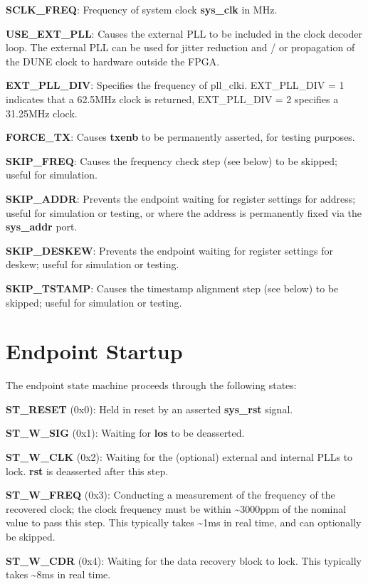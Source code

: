\documentclass{article}
\begin{document}
\textbf{SCLK\_FREQ}: Frequency of system clock \textbf{sys\_clk} in MHz.

\textbf{USE\_EXT\_PLL}: Causes the external PLL to be included in the clock decoder loop. The external PLL can be used for jitter reduction and / or propagation of the DUNE clock to hardware outside the FPGA.

\textbf{EXT\_PLL\_DIV}: Specifies the frequency of pll\_clki. EXT\_PLL\_DIV = 1 indicates that a 62.5MHz clock is returned, EXT\_PLL\_DIV = 2 specifies a 31.25MHz clock.

\textbf{FORCE\_TX}: Causes \textbf{txenb} to be permanently asserted, for testing purposes.

\textbf{SKIP\_FREQ}: Causes the frequency check step (see below) to be skipped; useful for simulation.

\textbf{SKIP\_ADDR}: Prevents the endpoint waiting for register settings for address; useful for simulation or testing, or where the address is permanently fixed via the \textbf{sys\_addr} port.

\textbf{SKIP\_DESKEW}: Prevents the endpoint waiting for register settings for deskew; useful for simulation or testing.

\textbf{SKIP\_TSTAMP}: Causes the timestamp alignment step (see below) to be skipped; useful for simulation or testing.

\section{Endpoint Startup}

The endpoint state machine proceeds through the following states:

\textbf{ST\_RESET} (0x0): Held in reset by an asserted \textbf{sys\_rst} signal.

\textbf{ST\_W\_SIG} (0x1): Waiting for \textbf{los} to be deasserted.

\textbf{ST\_W\_CLK} (0x2): Waiting for the (optional) external and internal PLLs to lock. \textbf{rst} is deasserted after this step.

\textbf{ST\_W\_FREQ} (0x3): Conducting a measurement of the frequency of the recovered clock; the clock frequency must be within \textasciitilde{}3000ppm of the nominal value to pass this step. This typically takes \textasciitilde{}1ms in real time, and can optionally be skipped.

\textbf{ST\_W\_CDR} (0x4): Waiting for the data recovery block to lock. This typically takes \textasciitilde{}8ms in real time.
\end{document}
